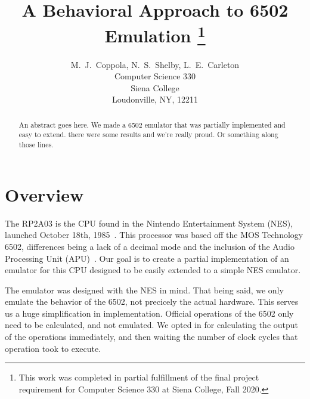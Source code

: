 \documentclass[12pt]{article}
\newcommand{\doublespace}{
  \protect\renewcommand\baselinestretch{1.5}
  \protect\normalsize
}
\begin{document}
\date{}

\title{A Behavioral Approach to 6502 Emulation
\footnote{This work was completed in partial fulfillment of the final
project requirement for Computer Science 330 at Siena College, Fall 2020.}}

\author{M.~J.~Coppola, N.~S.~Shelby, L.~E.~Carleton\\
Computer Science 330\\
Siena College\\
Loudonville, NY, 12211
}

\maketitle
\thispagestyle{empty}

\begin{abstract}
An abstract goes here. We made a 6502 emulator that was partially implemented and easy to extend.
there were some results and we're really proud. Or something along those lines.
\end{abstract}

\doublespace
\section{Overview}
\label{sec:overview}
The RP2A03 is the CPU found in the Nintendo Entertainment System (NES), launched October 18th, 1985~\cite{nesdev_CPU, wikipediaNES}.
This processor was based off the MOS Technology 6502, differences being a lack of a decimal mode
and the inclusion of the Audio Processing Unit (APU)~\cite{nesdev_CPU}. Our goal is to create a partial implementation
of an emulator for this CPU designed to be easily extended to a simple NES emulator. 

The emulator was designed with the NES in mind. That being said, we only emulate the behavior of
the 6502, not precicely the actual hardware. This serves us a huge simplification in implementation.
Official operations of the 6502 only need to be calculated, and not emulated. We opted in for calculating
the output of the operations immediately, and then waiting the number of clock cycles that operation
took to execute.
\end{document}
